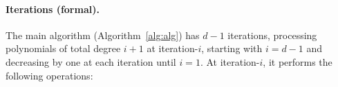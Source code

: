 



\paragraph*{Iterations (formal).}
The main algorithm (Algorithm~\ref{alg:alg}) has $d-1$ iterations, processing polynomials of total degree $i+1$ at iteration-$i$, starting with $i = d-1$ and decreasing by one at each iteration until $i=1$. 
At iteration-$i$, it performs the following operations:  



